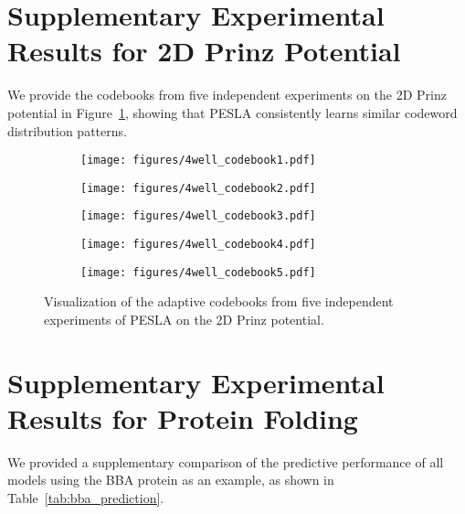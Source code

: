 \section{Supplementary Experimental Results for 2D Prinz Potential} \label{app:codebook_4well}

We provide the codebooks from five independent experiments on the 2D Prinz potential in Figure~\ref{fig:app_codebook_4well}, showing that PESLA consistently learns similar codeword distribution patterns.

\begin{figure}[!t]
    \centering
    \begin{subfigure}[b]{0.19\textwidth} %
        \centering
        \texttt{[image: figures/4well\_codebook1.pdf]}
    \end{subfigure}
    \begin{subfigure}[b]{0.19\textwidth}
        \centering
        \texttt{[image: figures/4well\_codebook2.pdf]}
    \end{subfigure}
    \begin{subfigure}[b]{0.19\textwidth}
        \centering
        \texttt{[image: figures/4well\_codebook3.pdf]}
    \end{subfigure}
    \begin{subfigure}[b]{0.19\textwidth}
        \centering
        \texttt{[image: figures/4well\_codebook4.pdf]}
    \end{subfigure}
    \begin{subfigure}[b]{0.19\textwidth}
        \centering
        \texttt{[image: figures/4well\_codebook5.pdf]}
    \end{subfigure}

    \caption{Visualization of the adaptive codebooks from five independent experiments of PESLA on the 2D Prinz potential.}
    \label{fig:app_codebook_4well}
\end{figure}


\section{Supplementary Experimental Results for Protein Folding} \label{app:protein_folding}

We provided a supplementary comparison of the predictive performance of all models using the BBA protein as an example, as shown in Table~\ref{tab:bba_prediction}.

